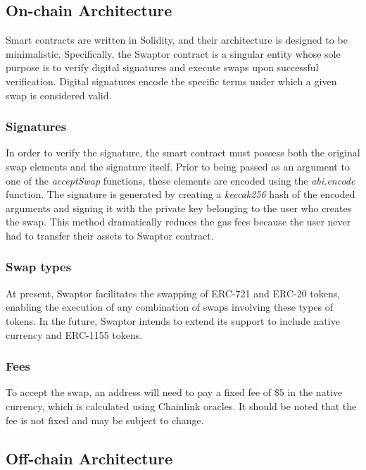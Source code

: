 \documentclass[12pt]{article}
\begin{document}
\subsection{On-chain Architecture}

\indent Smart contracts are written in Solidity, and their architecture is designed to be minimalistic.
Specifically, the Swaptor contract is a singular entity whose sole purpose is to verify digital signatures
and execute swaps upon successful verification. Digital signatures encode the specific terms under which a given swap is considered valid.

\subsubsection{Signatures}

In order to verify the signature, the smart contract must possess both the original swap elements
and the signature itself. Prior to being passed as an argument to one of the \textit{acceptSwap} functions,
these elements are encoded using the \textit{abi.encode} function. The signature is generated by creating a
\textit{keccak256} hash of the encoded arguments and signing it with the private key belonging to the user who creates the swap.
This method dramatically reduces the gas fees because the user never had to transfer their assets to Swaptor contract.

\subsubsection{Swap types}

At present, Swaptor facilitates the swapping of ERC-721 and ERC-20 tokens, enabling the execution of any combination of swaps involving these types of tokens.
In the future, Swaptor intends to extend its support to include native currency and ERC-1155 tokens.

\subsubsection{Fees}
To accept the swap, an address will need to pay a fixed fee of \$$5$ in the native currency, which is calculated using Chainlink oracles\cite{chainlink}. It should be noted that the fee is not fixed and may be subject to change.

\subsection{Off-chain Architecture}
\end{document}
